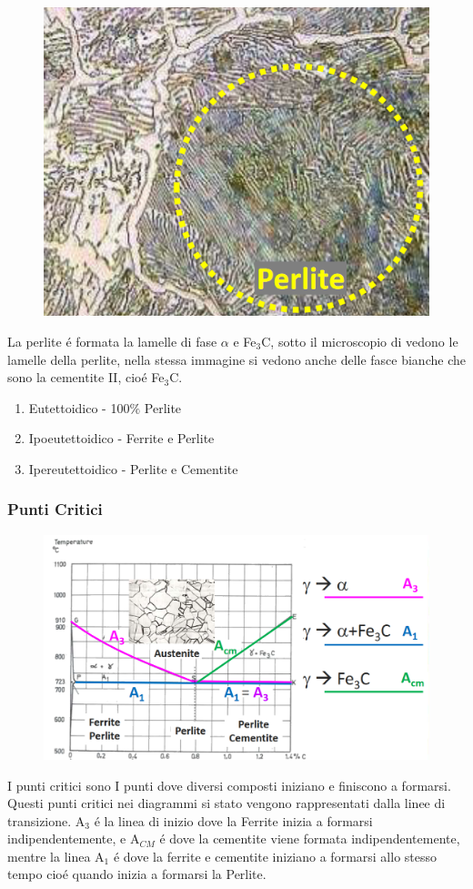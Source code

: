 \documentclass{article}
\begin{document}
{                \begin{figure}[h!]
                    \centering
                    \includegraphics[width=.65\linewidth]{L14 - Perlite e Cementite.png}
                \end{figure}
                La perlite \'e formata la lamelle di fase $\alpha$ e Fe$_3$C, sotto il microscopio di vedono le lamelle della perlite, nella stessa immagine si vedono anche delle fasce bianche che sono la cementite II, cio\'e Fe$_3$C.\\
                \begin{enumerate}
                    \item Eutettoidico - 100$\%$ Perlite
                    \item Ipoeutettoidico - Ferrite e Perlite
                    \item Ipereutettoidico - Perlite e Cementite
                \end{enumerate}
            \subsubsection{Punti Critici}
                \begin{figure}[h!]
                    \centering
                    \includegraphics[width=.8\linewidth]{L14 - Diagramma Punti Critici.png}
                \end{figure}
                I punti critici sono I punti dove diversi composti iniziano e finiscono a formarsi. Questi punti critici nei diagrammi si stato vengono rappresentati dalla linee di transizione. A$_3$ \'e la linea di inizio dove la Ferrite inizia a formarsi indipendentemente, e A$_{CM}$ \'e dove la cementite viene formata indipendentemente, mentre la linea A$_1$ \'e dove la ferrite e cementite iniziano a formarsi allo stesso tempo cio\'e quando inizia a formarsi la Perlite.\\

}
\end{document}
